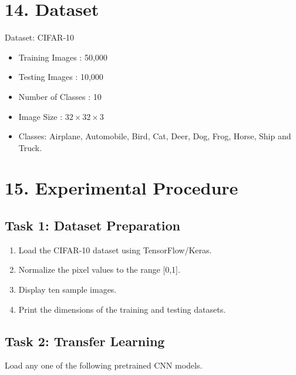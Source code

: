 \documentclass[11pt]{article}
\begin{document}
\section*{14. Dataset}

Dataset: CIFAR-10

\begin{itemize}

\item Training Images : 50,000

\item Testing Images : 10,000

\item Number of Classes : 10

\item Image Size : $32\times32\times3$

\item Classes:
Airplane, Automobile, Bird, Cat, Deer,
Dog, Frog, Horse, Ship and Truck.

\end{itemize}

\section*{15. Experimental Procedure}

\subsection*{Task 1: Dataset Preparation}

\begin{enumerate}

\item Load the CIFAR-10 dataset using TensorFlow/Keras.

\item Normalize the pixel values to the range [0,1].

\item Display ten sample images.

\item Print the dimensions of the training and testing datasets.

\end{enumerate}

\subsection*{Task 2: Transfer Learning}

Load any one of the following pretrained CNN models.
\end{document}
